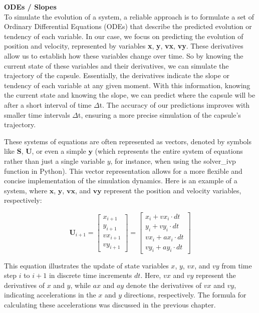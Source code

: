\documentclass[runningheads]{llncs}
\begin{document}
\textbf{ODEs / Slopes\\}
To simulate the evolution of a system, a reliable approach is to formulate a set of Ordinary Differential Equations (ODEs) that describe the predicted evolution or tendency of each variable. In our case, we focus on predicting the evolution of position and velocity, represented by variables \textbf{x}, \textbf{y}, \textbf{vx}, \textbf{vy}. These derivatives allow us to establish how these variables change over time. So by knowing the current state of these variables and their derivatives, we can simulate the trajectory of the capsule. Essentially, the derivatives indicate the slope or tendency of each variable at any given moment. With this information, knowing the current state and knowing the slope, we can predict where the capsule will be after a short interval of time \(\Delta\)t. The accuracy of our predictions improves with smaller time intervals \(\Delta\)t, ensuring a more precise simulation of the capsule's trajectory.

These systems of equations are often represented as vectors, denoted by symbols like \( \mathbf{S} \), \( \mathbf{U} \), or even a simple \( \mathbf{y} \) (which represents the entire system of equations rather than just a single variable \( y \), for instance, when using the solver\_ivp function in Python). This vector representation allows for a more flexible and concise implementation of the simulation dynamics. Here is an example of a system, where \( \mathbf{x} \), \( \mathbf{y} \), \( \mathbf{vx} \), and \( \mathbf{vy} \) represent the position and velocity variables, respectively:

\begin{equation}
\mathbf{U}_{i+1} = \begin{bmatrix}
x_{i+1} \\
y_{i+1} \\
vx_{i+1} \\
vy_{i+1}
\end{bmatrix} =
\begin{bmatrix}
x_i + vx_i \cdot dt \\
y_i + vy_i \cdot dt \\
vx_i + ax_i \cdot dt \\
vy_i + ay_i \cdot dt
\end{bmatrix}
\end{equation}

This equation illustrates the update of state variables \( x \), \( y \), \( vx \), and \( vy \) from time step \( i \) to \( i+1 \) in discrete time increments \( dt \). Here, \( vx \) and \( vy \) represent the derivatives of \( x \) and \( y \), while \( ax \) and \( ay \) denote the derivatives of \( vx \) and \( vy \), indicating accelerations in the \( x \) and \( y \) directions, respectively. The formula for calculating these accelerations was discussed in the previous chapter.
\end{document}
